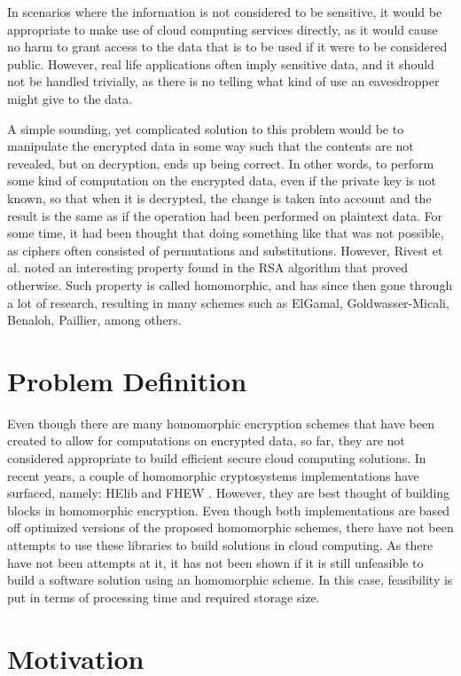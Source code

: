 In scenarios where the information is not considered to be sensitive, it would be appropriate to make use of cloud computing services directly, as it would cause no harm to grant access to the data that is to be used if it were to be considered public. However, real life applications often imply sensitive data, and it should not be handled trivially, as there is no telling what kind of use an eavesdropper might give to the data.

A simple sounding, yet complicated solution to this problem would be to manipulate the encrypted data in some way such that the contents are not revealed, but on decryption, ends up being correct. In other words, to perform some kind of computation on the encrypted data, even if the private key is not known, so that when it is decrypted, the change is taken into account and the result is the same as if the operation had been performed on plaintext data. For some time, it had been thought that doing something like that was not possible, as ciphers often consisted of permutations and substitutions. However, Rivest et al. \cite{rivest1978data} noted an interesting property found in the RSA algorithm that proved otherwise. Such property is called homomorphic, and has since then gone through a lot of research, resulting in many schemes such as ElGamal, Goldwasser-Micali, Benaloh, Paillier, among others.

\section{Problem Definition}

Even though there are many homomorphic encryption schemes that have been created to allow for computations on encrypted data, so far, they are not considered appropriate to build efficient secure cloud computing solutions. In recent years, a couple of homomorphic cryptosystems implementations have surfaced, namely: HElib \cite{helib} and FHEW \cite{fhew}. However, they are best thought of building blocks in homomorphic encryption. Even though both implementations are based off optimized versions of the proposed homomorphic schemes, there have not been attempts to use these libraries to build solutions in cloud computing. As there have not been attempts at it, it has not been shown if it is still unfeasible to build a software solution using an homomorphic scheme. In this case, feasibility is put in terms of processing time and required storage size. 

\section{Motivation}

